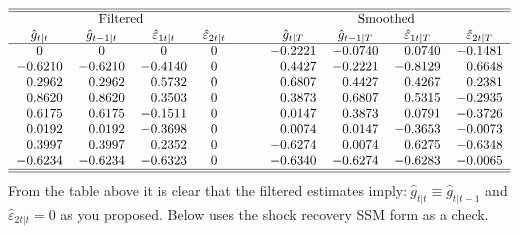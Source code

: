 \documentclass[a4paper,12pt]{article}
\begin{document}
\begin{equation*}
\begin{tabular}{ccccccccc}
\hline\hline
\multicolumn{4}{c}{Filtered} & ~~~ & \multicolumn{4}{c}{Smoothed} \\ 
$\hat{g}_{t|t}$ & $\hat{g}_{t-1|t}$ & $\hat{\varepsilon}_{1t|t}$ & $\hat{%
\varepsilon}_{2t|t}$ &  & $\hat{g}_{t|T}$ & $\hat{g}_{t-1|T}$ & $\hat{%
\varepsilon}_{1t|T}$ & $\hat{\varepsilon}_{2t|T}$ \\ \hline
$0$ & $0$ & $0$ & $0$ &  & \multicolumn{1}{r}{$-0.2221$} & 
\multicolumn{1}{r}{$-0.0740$} & \multicolumn{1}{r}{$0.0740$} & 
\multicolumn{1}{r}{$-0.1481$} \\ 
\multicolumn{1}{r}{$-0.6210$} & \multicolumn{1}{r}{$-0.6210$} & 
\multicolumn{1}{r}{$-0.4140$} & $0$ &  & \multicolumn{1}{r}{$0.4427$} & 
\multicolumn{1}{r}{$-0.2221$} & \multicolumn{1}{r}{$-0.8129$} & 
\multicolumn{1}{r}{$0.6648$} \\ 
\multicolumn{1}{r}{$0.2962$} & \multicolumn{1}{r}{$0.2962$} & 
\multicolumn{1}{r}{$0.5732$} & $0$ &  & \multicolumn{1}{r}{$0.6807$} & 
\multicolumn{1}{r}{$0.4427$} & \multicolumn{1}{r}{$0.4267$} & 
\multicolumn{1}{r}{$0.2381$} \\ 
\multicolumn{1}{r}{$0.8620$} & \multicolumn{1}{r}{$0.8620$} & 
\multicolumn{1}{r}{$0.3503$} & $0$ &  & \multicolumn{1}{r}{$0.3873$} & 
\multicolumn{1}{r}{$0.6807$} & \multicolumn{1}{r}{$0.5315$} & 
\multicolumn{1}{r}{$-0.2935$} \\ 
\multicolumn{1}{r}{$0.6175$} & \multicolumn{1}{r}{$0.6175$} & 
\multicolumn{1}{r}{$-0.1511$} & $0$ &  & \multicolumn{1}{r}{$0.0147$} & 
\multicolumn{1}{r}{$0.3873$} & \multicolumn{1}{r}{$0.0791$} & 
\multicolumn{1}{r}{$-0.3726$} \\ 
\multicolumn{1}{r}{$0.0192$} & \multicolumn{1}{r}{$0.0192$} & 
\multicolumn{1}{r}{$-0.3698$} & $0$ &  & \multicolumn{1}{r}{$0.0074$} & 
\multicolumn{1}{r}{$0.0147$} & \multicolumn{1}{r}{$-0.3653$} & 
\multicolumn{1}{r}{$-0.0073$} \\ 
\multicolumn{1}{r}{$0.3997$} & \multicolumn{1}{r}{$0.3997$} & 
\multicolumn{1}{r}{$0.2352$} & $0$ &  & \multicolumn{1}{r}{$-0.6274$} & 
\multicolumn{1}{r}{$0.0074$} & \multicolumn{1}{r}{$0.6275$} & 
\multicolumn{1}{r}{$-0.6348$} \\ 
\multicolumn{1}{r}{$-0.6234$} & \multicolumn{1}{r}{$-0.6234$} & 
\multicolumn{1}{r}{$-0.6323$} & $0$ &  & \multicolumn{1}{r}{$-0.6340$} & 
\multicolumn{1}{r}{$-0.6274$} & \multicolumn{1}{r}{$-0.6283$} & 
\multicolumn{1}{r}{$-0.0065$} \\ \hline\hline
\end{tabular}%
\end{equation*}%
From the table above it is clear that the filtered estimates imply:$\ \hat{g}%
_{t|t}\equiv \hat{g}_{t|t-1}$ and $\hat{\varepsilon}_{2t|t}=0$ as you
proposed. Below uses the shock recovery SSM form as a check.
\end{document}
